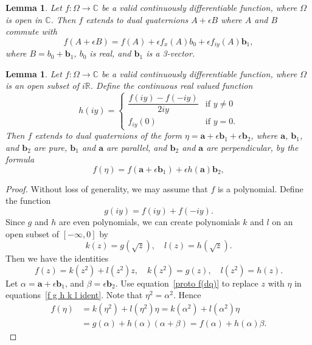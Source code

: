 \documentclass[12pt,reqno]{amsart}
\newtheorem{lemma}[theorem]{Lemma}
\begin{document}
\begin{lemma}
\label{f(dq) commute}
Let $f:\Omega \to \mathbb C$ be a valid continuously differentiable function, where $\Omega$ is open in $\mathbb C$.  Then $f$ extends to dual quaternions $A + \epsilon B$ where $A$ and $B$ commute with
\begin{equation}
\label{commuting case}
f(A + \epsilon B ) = f(A) + \epsilon f_x(A) b_0
+ \epsilon f_{iy}(A) \bm b_1 ,
\end{equation}
where $B = b_0 + \bm b_1$, $b_0$ is real, and $\bm b_1$ is a 3-vector.
\end{lemma}

\begin{lemma}
\label{f(dq) anti commute}
Let $f:\Omega \to \mathbb C$ be a valid continuously differentiable function, where $\Omega$ is an open subset of $i\mathbb R$.  Define the continuous real valued function
\begin{equation}
\label{h ident 2}
h(iy) = \begin{cases}
\dfrac{f(iy) - f(-iy)}{2iy} &\text{if $y \ne 0$} \\
f_{iy}(0) &\text{if $y = 0$} .
\end{cases}
\end{equation}
Then $f$ extends to dual quaternions of the form $\eta = \bm a + \epsilon \bm b_1 + \epsilon \bm b_2$, where $\bm a$, $\bm b_1$, and $\bm b_2$ are pure, $\bm b_1$ and $\bm a$ are parallel, and $\bm b_2$ and $\bm a$ are perpendicular, by the formula
\begin{equation}
\label{f(dq) anti commute equ}
f(\eta) = f(\bm a + \epsilon \bm b_1) + \epsilon h(\bm a) \bm b_2 ,
\end{equation}
\end{lemma}

\begin{proof}  Without loss of generality, we may assume that $f$ is a polynomial.  Define the function
\begin{equation}
g(iy) = f(iy) + f(-iy) .
\end{equation}
Since $g$ and $h$ are even polynomials, we can create polynomials $k$ and $l$ on an open subset of $[-\infty,0]$ by
\begin{equation}
k(z) = g(\sqrt z), \quad l(z) = h(\sqrt z) .
\end{equation}
Then we have the identities
\begin{equation}
\label{f g h k l ident}
f(z) = k(z^2) + l(z^2) z , \quad k(z^2) = g(z), \quad l(z^2) = h(z) .
\end{equation}
Let $\alpha = \bm a + \epsilon \bm b_1$, and $\beta = \epsilon\bm b_2$.  Use equation~\eqref{proto f(dq)} to replace $z$ with $\eta$ in equations~\eqref{f g h k l ident}.  Note that $\eta^2 = \alpha^2$.  Hence
\begin{equation}
\begin{aligned}
f(\eta)
&= k(\eta^2) + l(\eta^2) \eta = k(\alpha^2) + l(\alpha^2) \eta \\
&= g(\alpha) + h(\alpha) (\alpha + \beta) = f(\alpha) + h(\alpha) \beta.
\end{aligned}
\end{equation}
\end{proof}
\end{document}
